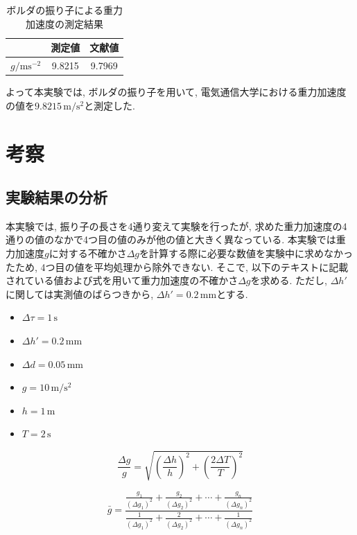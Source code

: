 \documentclass{jarticle}
\begin{document}
\begin{table}[h]
  \centering
  \caption{ボルダの振り子による重力加速度の測定結果}
  \begin{tabular}{ccc}
    \hline
    & 測定値 & 文献値 \\
    \hline
    $g/\mathrm{ms^{-2}}$ & 9.8215 & 9.7969 \\
    \hline
  \end{tabular}
\end{table}

よって本実験では, ボルダの振り子を用いて, 電気通信大学における重力加速度の値を$9.8215\,\mathrm{m/s^2}$と測定した.


\section{考察}


\subsection{実験結果の分析}

本実験では, 振り子の長さを4通り変えて実験を行ったが, 求めた重力加速度の4通りの値のなかで4つ目の値のみが他の値と大きく異なっている.
本実験では重力加速度$g$に対する不確かさ$\Delta g$を計算する際に必要な数値を実験中に求めなかったため, 4つ目の値を平均処理から除外できない.
そこで, 以下のテキストに記載されている値および式を用いて重力加速度の不確かさ$\Delta g$を求める. ただし, $\Delta h'$に関しては実測値のばらつきから, $\Delta h'=0.2\,\mathrm{mm}$とする.

\begin{itemize}
  \item $\Delta\tau=1\,\mathrm{s}$
  \item $\Delta h'=0.2\,\mathrm{mm}$
  \item $\Delta d=0.05\,\mathrm{mm}$
  \item $g=10\,\mathrm{m/s^2}$
  \item $h=1\,\mathrm{m}$
  \item $T=2\,\mathrm{s}$
\end{itemize}

\begin{equation}
  \frac{\Delta g}{g}=\sqrt{\left(\frac{\Delta h}{h}\right)^2+\left(\frac{2\Delta T}{T}\right)^2}
\end{equation}

\begin{equation}
  \bar{g}=\frac{
    \frac{g_1}{(\Delta g_1)^2} + \frac{g_2}{(\Delta g_2)^2}+\cdots+\frac{g_n}{(\Delta g_n)^2}
  }{
    \frac{1}{(\Delta g_1)^2} + \frac{2}{(\Delta g_2)^2}+\cdots+\frac{1}{(\Delta g_n)^2}
  }
\end{equation}
\end{document}
